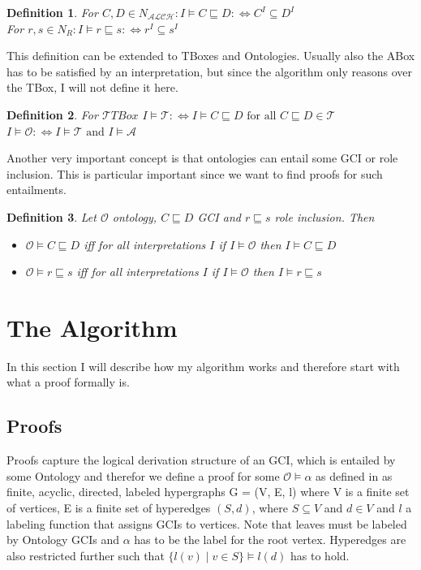 \documentclass[titlepage]{article}
\newtheorem{definition}{Definition}
\begin{document}
\begin{definition}
    For $C, D \in N_{\mathcal{ALCH}}: I \models C \sqsubseteq D  :\iff C^I \subseteq D^I$ \\
    For $r, s \in N_R: I \models r \sqsubseteq s  :\iff r^I \subseteq s^I$
\end{definition}


This definition can be extended to TBoxes and Ontologies. Usually also the ABox
has to be satisfied by an interpretation, but since the algorithm only reasons over the TBox,
 I will not define it here.
\begin{definition}
  For $\mathcal{T} TBox $
  $I \models \mathcal{T} :\iff I \models C \sqsubseteq D \text{ for all } C \sqsubseteq D \in \mathcal{T}$ \\
  $I \models \mathcal{O} :\iff I \models \mathcal{T} \text{ and } I \models \mathcal{A}$
\end{definition}

Another very important concept is that ontologies can entail some GCI or role inclusion.
This is particular important since we want to find proofs for such entailments.
\begin{definition}
  Let $\mathcal{O}$ ontology, $C \sqsubseteq D$ GCI and $r \sqsubseteq s$ role inclusion.
  Then 
  \begin{itemize}
    \item $\mathcal{O} \models C \sqsubseteq D$ iff for all interpretations $I$
    if $I \models \mathcal{O}$ then $I \models C \sqsubseteq D$
    \item $\mathcal{O} \models r \sqsubseteq s$ iff for all interpretations $I$
    if $I \models \mathcal{O}$ then $I \models r \sqsubseteq s$
  \end{itemize} 

\end{definition}






\section{The Algorithm}
In this section I will describe how my algorithm works and therefore start with what a
proof formally is.

\subsection{Proofs}
Proofs capture the logical derivation structure of an GCI, which is entailed by some Ontology and 
therefor we define a proof for some $\mathcal{O} \models \alpha $ as defined in \cite{10.1007/978-3-031-10769-6_16} 
as finite, acyclic, directed, labeled hypergraphs G = (V, E, l) where V is a finite set of vertices, 
E is a finite set of hyperedges $(S,d)$, where $S \subseteq V$ and $d \in V$
and $l$ a labeling function that assigns GCIs to vertices. Note that leaves must be labeled by Ontology GCIs and
$\alpha$ has to be the label for the root vertex. Hyperedges are also restricted further such that  
$\{l(v) \mid v \in S \} \models l(d)$ has to hold.
\end{document}
